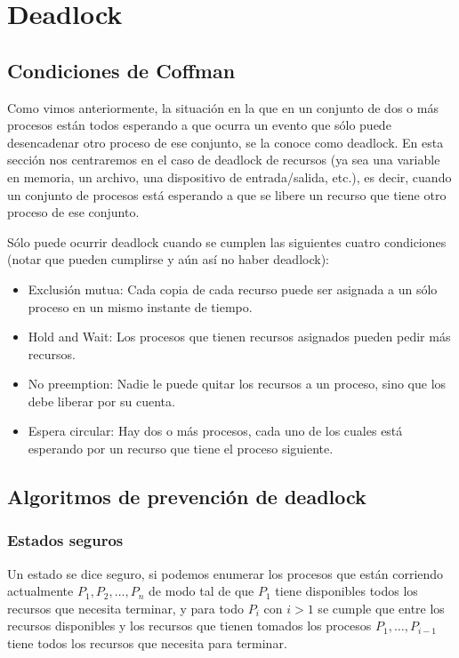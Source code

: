 \documentclass{article}
\begin{document}
\section{Deadlock}

\subsection{Condiciones de Coffman}

Como vimos anteriormente, la situaci\'on en la que en un conjunto de dos o m\'as procesos est\'an todos esperando a que ocurra un evento que s\'olo puede desencadenar otro proceso de ese conjunto, se la conoce como deadlock. En esta secci\'on nos centraremos en el caso de deadlock de recursos (ya sea una variable en memoria, un archivo, una dispositivo de entrada/salida, etc.),  es decir, cuando un conjunto de procesos est\'a esperando a que se libere un recurso que tiene otro proceso de ese conjunto.

S\'olo puede ocurrir deadlock cuando se cumplen las siguientes cuatro condiciones (notar que pueden cumplirse y a\'un as\'i no haber deadlock):

\begin{itemize}
\item Exclusi\'on mutua: Cada copia de cada recurso puede ser asignada a un s\'olo proceso en un mismo instante de tiempo.
\item Hold and Wait: Los procesos que tienen recursos asignados pueden pedir m\'as recursos.
\item No preemption: Nadie le puede quitar los recursos a un proceso, sino que los debe liberar por su cuenta.
\item Espera circular: Hay dos o m\'as procesos, cada uno de los cuales est\'a esperando por un recurso que tiene el proceso siguiente.
\end{itemize}

\subsection{Algoritmos de prevenci\'on de deadlock}

\subsubsection{Estados seguros}

Un estado se dice seguro, si podemos enumerar los procesos que est\'an corriendo actualmente $P_1,P_2,\dots,P_n$ de modo tal de que $P_1$ tiene disponibles todos los recursos que necesita terminar, y para todo $P_i$ con $i > 1$ se cumple que entre los recursos disponibles y los recursos que tienen tomados los procesos $P_1,\dots,P_{i-1}$ tiene todos los recursos que necesita para terminar.
\end{document}

